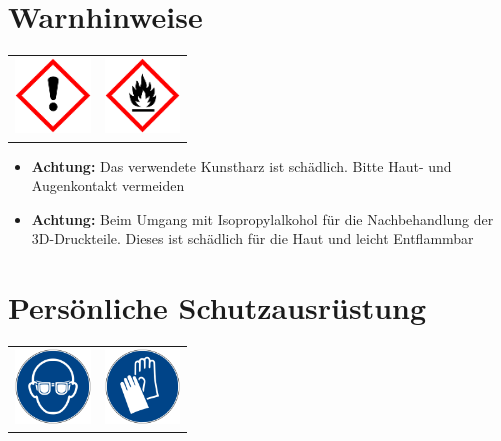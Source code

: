 \documentclass{\basedir/fablab-document}
\begin{document}
\section{Warnhinweise}
\begin{table}[h]
	\centering
	\begin{tabular}{cc}
		
		\includegraphics[width=2cm]{bilder/GHSa.png}  & \includegraphics[width=2cm]{bilder/GHSf.png} \\
	\end{tabular}
\end{table}

\begin{itemize}
	\item \textbf{Achtung:} Das verwendete Kunstharz ist schädlich. Bitte Haut- und Augenkontakt vermeiden \\
	\item \textbf{Achtung:} Beim Umgang mit Isopropylalkohol für die Nachbehandlung der 3D-Druckteile. Dieses ist schädlich für die Haut und leicht Entflammbar\\
\end{itemize}

\section{Persönliche Schutzausrüstung}
\begin{table}[h]
	\centering
	\begin{tabular}{cc}
		
	 \includegraphics[width=2cm]{bilder/gaugenschutz.png}  & \includegraphics[width=2cm]{bilder/ghandschuh.png} \\
	\end{tabular}
\end{table}
\end{document}
